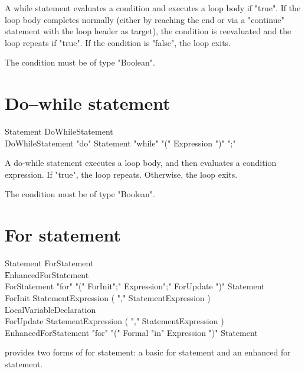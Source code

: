A while statement evaluates a condition and executes a loop body
if \xcd"true".  If the loop body completes normally (either by reaching
the end or via a \xcd"continue" statement with the loop header
as target), the condition is reevaluated and the loop repeats if
\xcd"true".  If the condition is \xcd"false", the loop
exits.

The condition must be of type \xcd"Boolean".

\section{Do--while statement}

\begin{grammar}
Statement \: DoWhileStatement \\
DoWhileStatement \: \xcd"do" Statement \xcd"while" \xcd"(" Expression \xcd")" \xcd";" \\
\end{grammar}


A do-while statement executes a loop body, and then evaluates a
condition expression.  If \xcd"true", the loop repeats.
Otherwise, the loop exits.

The condition must be of type \xcd"Boolean".

\section{For statement}

\begin{grammar}
Statement \: ForStatement \\
          \| EnhancedForStatement \\
ForStatement \: \xcd"for" \xcd"("
        ForInit\opt \xcd";" Expression\opt \xcd";" ForUpdate\opt
        \xcd")" Statement \\
ForInit \:
        StatementExpression ( \xcd"," StatementExpression )\star
        \\
      \| LocalVariableDeclaration \\
ForUpdate \:
        StatementExpression ( \xcd"," StatementExpression )\star\\
EnhancedForStatement \: \xcd"for" \xcd"("
        Formal \xcd"in" Expression 
        \xcd")" Statement \\
\end{grammar}

\Xten{} provides two forms of for statement: a basic for
statement and an enhanced for statement.

